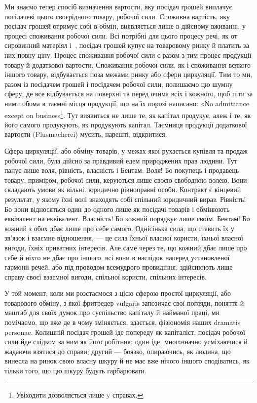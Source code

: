 Ми знаємо тепер спосіб визначення вартости, яку посідач
грошей виплачує посідачеві цього своєрідного товару, робочої
сили. Споживна вартість, яку посідач грошей отримує собі в
обмін, виявляється лише в дійсному вживанні, у процесі споживання
робочої сили. Всі потрібні для цього процесу речі, як от
сировинний матеріял і~, посідач грошей купує на товаровому
ринку й платить за них повну ціну. Процес споживання
робочої сили є разом з тим процес продукції товару й додаткової
вартости. Споживання робочої сили, як і споживання всякого
іншого товару, відбувається поза межами ринку або сфери циркуляції.
Тим то ми, разом із посідачем грошей і посідачем робочої
сили, полишаємо цю шумну сферу, де все відбувається на поверхні
та перед очима всіх і кожного, щоб піти за ними обома в таємні
місця продукції, що на їх порозі написано: «No admittance except
on business\footnote*{
Увіходити дозволяється лише y справах. 
}. Тут виявиться не лише те, як капітал продукує,
алеж і те, як його самого продукують, як продукують капітал.
Таємниця продукції додаткової вартости (Plusmacherei) мусить,
нарешті, відкритися.

Сфера циркуляції, або обміну товарів, у межах якої рухається
купівля та продаж робочої сили, була дійсно за правдивий
едем природжених прав людини. Тут панує лише воля, рівність,
власність і Бентам. Воля! Бо покупець і продавець товару, приміром,
робочої сили, керуються лише своєю свободною волею.
Вони складають умови як вільні, юридично рівноправні особи.
Контракт є кінцевий результат, у якому їхні волі знаходять собі
спільний юридичний вираз. Рівність! Бо вони відносяться один
до одного лише як посідачі товарів і обмінюють еквівалент на
еквівалент. Власність! Бо кожний порядкує лише своїм. Бентам!
Бо кожний з обох дбає лише про себе самого. Однісінька
сила, що ставить їх у зв’язок і взаємне відношення, — це сила
їхньої власної користи, їхньої власної вигоди, їхніх приватних
інтересів. Але саме через те, що кожний дбає лише про себе й
ніхто не дбає про іншого, всі вони в наслідок наперед установленої
гармонії речей, або під проводом всемудрого провидіння,
здійснюють лише справу своєї взаємної вигоди, спільної користи,
спільних інтересів.

У той момент, коли ми розстаємося з цією сферою простої
циркуляції, або товарового обміну, з якої фритредер vulgaris
запозичає свої погляди, поняття й маштаб для своїх думок про
суспільство капіталу й найманої праці, ми помічаємо, що вже де
в чому зміняється, здається, фізіономія наших dramatis personae.
Колишній посідач грошей іде попереду як капіталіст, посідач
робочої сили йде слідком за ним як його робітник; один іде,
многозначно усміхаючися й жадаючи взятися до справи; другий —
боязко, опираючись, як людина, що винесла на ринок свою власну
шкуру й не має вже нічого іншого сподіватись, як тільки того,
що цю шкуру будуть гарбарювати.
